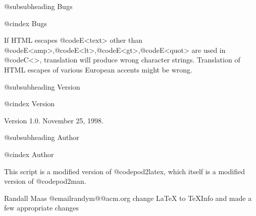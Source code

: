 @subsubheading Bugs

@cindex Bugs

If HTML escapes @code{E}<text> other than @code{E}<amp>,@code{E}<lt>,@code{E}<gt>,@code{E}<quot> are
used in @code{C}<>, translation will produce wrong character strings.
Translation of HTML escapes of various European accents might be wrong.

@subsubheading Version

@cindex Version

Version 1.0.  November 25, 1998.

@subsubheading Author

@cindex Author

This script is a modified version of @code{pod2latex}, which itself is a
modified version of @code{pod2man}.

Randall Maas @email{randym@@acm.org} change LaTeX to TeXInfo and made a few
appropriate changes

